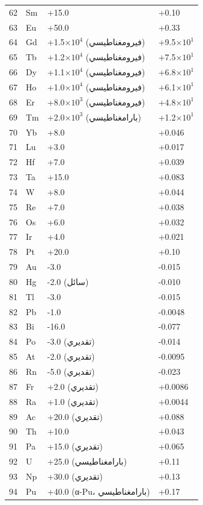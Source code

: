 \documentclass[11pt,a4paper]{article}
\begin{document}
\begin{otherlanguage}{arabic}
\begin{longtable}{p{0.6cm}p{1.2cm}p{2.5cm}p{2.5cm}}
			62 & Sm & +15.0 & +0.10 \\
			63 & Eu & +50.0 & +0.33 \\
			64 & Gd & +1.5\(\times10^4\) (فيرومغناطيسي) & +9.5\(\times10^1\) \\
			65 & Tb & +1.2\(\times10^4\) (فيرومغناطيسي) & +7.5\(\times10^1\) \\
			66 & Dy & +1.1\(\times10^4\) (فيرومغناطيسي) & +6.8\(\times10^1\) \\
			67 & Ho & +1.0\(\times10^4\) (فيرومغناطيسي) & +6.1\(\times10^1\) \\
			68 & Er & +8.0\(\times10^3\) (فيرومغناطيسي) & +4.8\(\times10^1\) \\
			69 & Tm & +2.0\(\times10^3\) (بارامغناطيسي) & +1.2\(\times10^1\) \\
			70 & Yb & +8.0 & +0.046 \\
			71 & Lu & +3.0 & +0.017 \\
			72 & Hf & +7.0 & +0.039 \\
			73 & Ta & +15.0 & +0.083 \\
			74 & W  & +8.0 & +0.044 \\
			75 & Re & +7.0 & +0.038 \\
			76 & Os & +6.0 & +0.032 \\
			77 & Ir & +4.0 & +0.021 \\
			78 & Pt & +20.0 & +0.10 \\
			79 & Au & -3.0 & -0.015 \\
			80 & Hg & -2.0 (سائل) & -0.010 \\
			81 & Tl & -3.0 & -0.015 \\
			82 & Pb & -1.0 & -0.0048 \\
			83 & Bi & -16.0 & -0.077 \\
			84 & Po & -3.0 (تقديري) & -0.014 \\
			85 & At & -2.0 (تقديري) & -0.0095 \\
			86 & Rn & -5.0 (تقديري) & -0.023 \\
			87 & Fr & +2.0 (تقديري) & +0.0086 \\
			88 & Ra & +1.0 (تقديري) & +0.0044 \\
			89 & Ac & +20.0 (تقديري) & +0.088 \\
			90 & Th & +10.0 & +0.043 \\
			91 & Pa & +15.0 (تقديري) & +0.065 \\
			92 & U  & +25.0 (بارامغناطيسي) & +0.11 \\
			93 & Np & +30.0 (تقديري) & +0.13 \\
			94 & Pu & +40.0 (α-Pu، بارامغناطيسي) & +0.17 \\

\end{longtable}
\end{otherlanguage}
\end{document}

